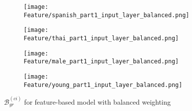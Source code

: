\begin{figure}[H]
    \centering
    \begin{minipage}{0.23\textwidth}
        \begin{figure}[H]
            \centering
            \texttt{[image: Feature/spanish\_part1\_input\_layer\_balanced.png]}
        \end{figure}
    \end{minipage}
    \begin{minipage}{0.23\textwidth}
        \begin{figure}[H]
            \centering
            \texttt{[image: Feature/thai\_part1\_input\_layer\_balanced.png]}
        \end{figure}
    \end{minipage}
    \begin{minipage}{0.23\textwidth}
        \begin{figure}[H]
            \centering
            \texttt{[image: Feature/male\_part1\_input\_layer\_balanced.png]}
        \end{figure}
    \end{minipage}
    \begin{minipage}{0.23\textwidth}
        \begin{figure}[H]
            \centering
            \texttt{[image: Feature/young\_part1\_input\_layer\_balanced.png]}
        \end{figure}
    \end{minipage}
    \caption{$\mathcal{B}_{gr}^{(ci)}$ for feature-based model with balanced weighting}
    \label{fig:grad_feature_balanced}
\end{figure}

